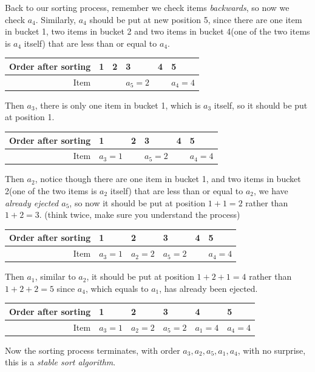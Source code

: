 \begin{spacing}{1.3}
    Back to our sorting process, remember we check items {\it backwards}, 
    so now we check $a_4$. Similarly, $a_4$
    should be put at new position 5, since there are 
    one item in bucket 1, two items in bucket 2 and two items in 
    bucket 4(one of the two items is $a_4$ itself)
    that are less than or equal to $a_4$.
    \begin{center}
        \begin{tabular}{r|C{2cm}|C{2cm}|C{2cm}|C{2cm}|C{2cm}}
            \hline
            Order after sorting & 1 & 2 & 3 & 4 & 5\\\hline
            Item &  &  & $a_5=2$ & & $a_4=4$\\\hline
        \end{tabular}
    \end{center}
    Then $a_3$, there is only one item in bucket 1, which is $a_3$ itself, 
    so it should be put at position 1.
    \begin{center}
        \begin{tabular}{r|C{2cm}|C{2cm}|C{2cm}|C{2cm}|C{2cm}}
            \hline
            Order after sorting & 1 & 2 & 3 & 4 & 5\\\hline
            Item & $a_3=1$ &  & $a_5=2$ & & $a_4=4$\\\hline
        \end{tabular}
    \end{center}
    Then $a_2$, notice though there are 
    one item in bucket 1, and two items in bucket 2(one of the two items is $a_2$ itself)
    that are less than or equal to $a_2$, we have {\it already ejected $a_5$},
    so now it should be put at position $1+1=2$ rather than $1+2=3$.
    (think twice, make sure you understand the process)
    \begin{center}
        \begin{tabular}{r|C{2cm}|C{2cm}|C{2cm}|C{2cm}|C{2cm}}
            \hline
            Order after sorting & 1 & 2 & 3 & 4 & 5\\\hline
            Item & $a_3=1$ & $a_2=2$ & $a_5=2$ & & $a_4=4$\\\hline
        \end{tabular}
    \end{center}
    Then $a_1$, similar to $a_2$, it should be put at position $1+2+1=4$ rather than 
    $1+2+2=5$ since $a_4$, which equals to $a_1$, has already been ejected.
    \begin{center}
        \begin{tabular}{r|C{2cm}|C{2cm}|C{2cm}|C{2cm}|C{2cm}}
            \hline
            Order after sorting & 1 & 2 & 3 & 4 & 5\\\hline
            Item & $a_3=1$ & $a_2=2$ & $a_5=2$ & $a_1=4$ & $a_4=4$\\\hline
        \end{tabular}
    \end{center}
    Now the sorting process terminates, with order $a_3, a_2, a_5, a_1, a_4$, 
    with no surprise, this is a {\it stable sort algorithm}.


\end{spacing}
